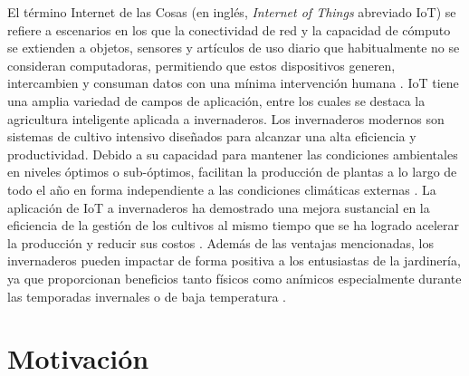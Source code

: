 El término Internet de las Cosas (en inglés, \textit{Internet of Things} abreviado IoT) se refiere a escenarios en los que la conectividad de red y la capacidad de cómputo se extienden a objetos, sensores y artículos de uso diario que habitualmente no se consideran computadoras, permitiendo que estos dispositivos generen, intercambien y consuman datos con una mínima intervención humana \citep{iotOverview}.
IoT tiene una amplia variedad de campos de aplicación, entre los cuales se destaca la agricultura inteligente aplicada a invernaderos.
Los invernaderos modernos son sistemas de cultivo intensivo diseñados para alcanzar una alta eficiencia y productividad. Debido a su capacidad para mantener las condiciones ambientales en niveles óptimos o sub-óptimos, facilitan la producción de plantas a lo largo de todo el año en forma independiente a las condiciones climáticas externas \citep{HistoryofControlledEnvironmentHorticultureGreenhouses}.
La aplicación de IoT a invernaderos ha demostrado una mejora sustancial en la eficiencia de la gestión de los cultivos al mismo tiempo que se ha logrado acelerar la producción y reducir sus costos \citep{IoTparaInvernaderos}.
Además de las ventajas mencionadas, los invernaderos pueden impactar de forma positiva a los entusiastas de la jardinería, ya que proporcionan beneficios tanto físicos como anímicos especialmente durante las temporadas invernales o de baja temperatura \citep{GreenHousesForHomeOwnersAndGardeners}. \\


\section{Motivación}
\label{Motivación}


